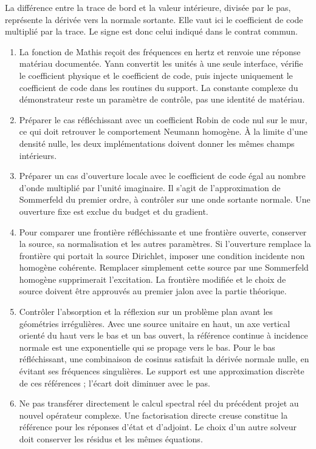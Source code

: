 \documentclass[11pt,a4paper]{article}
\begin{document}
   La différence entre la trace de bord et la valeur intérieure, divisée par le pas, représente la dérivée vers la normale sortante. Elle vaut ici le coefficient de code multiplié par la trace. Le signe est donc celui indiqué dans le contrat commun.
\begin{enumerate}
\item La fonction de Mathis reçoit des fréquences en hertz et renvoie une réponse matériau documentée. Yann convertit les unités à une seule interface, vérifie le coefficient physique et le coefficient de code, puis injecte uniquement le coefficient de code dans les routines du support. La constante complexe du démonstrateur reste un paramètre de contrôle, pas une identité de matériau.
\item Préparer le cas réfléchissant avec un coefficient Robin de code nul sur le mur, ce qui doit retrouver le comportement Neumann homogène. À la limite d'une densité nulle, les deux implémentations doivent donner les mêmes champs intérieurs.
\item Préparer un cas d'ouverture locale avec le coefficient de code égal au nombre d'onde multiplié par l'unité imaginaire. Il s'agit de l'approximation de Sommerfeld du premier ordre, à contrôler sur une onde sortante normale. Une ouverture fixe est exclue du budget et du gradient.
\item Pour comparer une frontière réfléchissante et une frontière ouverte, conserver la source, sa normalisation et les autres paramètres. Si l'ouverture remplace la frontière qui portait la source Dirichlet, imposer une condition incidente non homogène cohérente. Remplacer simplement cette source par une Sommerfeld homogène supprimerait l'excitation. La frontière modifiée et le choix de source doivent être approuvés au premier jalon avec la partie théorique.
\item Contrôler l'absorption et la réflexion sur un problème plan avant les géométries irrégulières. Avec une source unitaire en haut, un axe vertical orienté du haut vers le bas et un bas ouvert, la référence continue à incidence normale est une exponentielle qui se propage vers le bas. Pour le bas réfléchissant, une combinaison de cosinus satisfait la dérivée normale nulle, en évitant ses fréquences singulières. Le support est une approximation discrète de ces références ; l'écart doit diminuer avec le pas.
\item Ne pas transférer directement le calcul spectral réel du précédent projet au nouvel opérateur complexe. Une factorisation directe creuse constitue la référence pour les réponses d'état et d'adjoint. Le choix d'un autre solveur doit conserver les résidus et les mêmes équations.
\end{enumerate}
\end{document}
